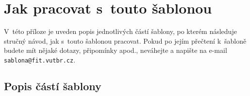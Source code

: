 





\chapter{Jak pracovat s~touto šablonou}
\label{jak}

V~této příloze je uveden popis jednotlivých částí šablony, po kterém následuje stručný návod, jak s~touto šablonou pracovat. Pokud po jejím přečtení k~šabloně budete mít nějaké dotazy, připomínky apod., neváhejte a napište na e-mail \texttt{sablona@fit.vutbr.cz}.

\section*{Popis částí šablony}

